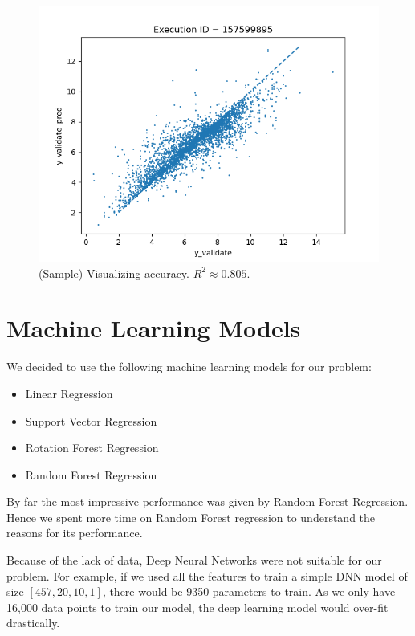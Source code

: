 \documentclass[11pt]{article}
\begin{document}
\begin{figure}[htb]
  \centering
    \includegraphics[width=1.0\textwidth]{images/accuracy_validate}
    \caption{(Sample) Visualizing accuracy.  $R^2 \approx 0.805$.}
    \label{fig:modelQualityVisualization}
\end{figure}


\section{Machine Learning Models}
\label{MachineLearningModelslabel}
We decided to use the following machine learning models for our problem:
\begin{itemize}
\item Linear Regression
\item Support Vector Regression
\item Rotation Forest Regression
\item Random Forest Regression
\end{itemize}

By far the most impressive performance was given by Random Forest Regression.
Hence we spent more time on Random Forest regression to understand the reasons for its performance.

Because of the lack of data, Deep Neural Networks were not suitable for our problem. 
For example, if we used all the features to train a simple DNN model of size $[457,  20, 10,  1]$,  there would be 9350 parameters to train.  As we only have 16,000 data points to train our model,  the deep learning model would over-fit drastically.
\end{document}

